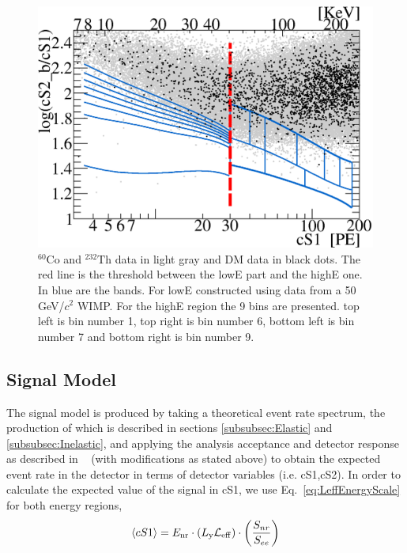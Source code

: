 \begin{figure}[]
\begin{minipage}{1\linewidth}
\centerline{\includegraphics[width=1\linewidth]{Figures/eft_sr.eps}}
\end{minipage}
\caption{$^{60}\mathrm{Co}$ and $^{232}\mathrm{Th}$ data in light gray and DM data in black dots. The red line is the threshold between the lowE part and the highE one. In blue are the bands. For lowE constructed using data from a 50 GeV/$c^2$ WIMP. For the highE region the 9 bins are presented. top left is bin number 1,  top right is bin number 6, bottom left is bin number 7 and bottom right is bin number 9.}
\label{fig:phasespace}
\end{figure}  




\subsection{Signal Model}
\label{subsec:SignalModel}
The signal model is produced by taking a theoretical event rate spectrum, the production of which is described in sections \ref{subsubsec:Elastic} and \ref{subsubsec:Inelastic}, and applying the analysis acceptance and detector response as described in ~\cite{xe100_ana2012} (with modifications as stated above) to obtain the expected event rate in the detector in terms of detector variables (i.e. cS1,cS2). In order to calculate the expected value of the signal in cS1, we use Eq.~\ref{eq:LeffEnergyScale} for both energy regions, 
\begin{equation}
\label{eq:LeffEnergyScale}
	\langle cS1 \rangle = E_{\mathrm{nr}} \cdot (L_{\mathrm{y}} \mathcal{L}_{\mathrm{eff}}) \cdot   \left(\frac{S_{nr}}{S_{ee}}\right) 
\end{equation}

